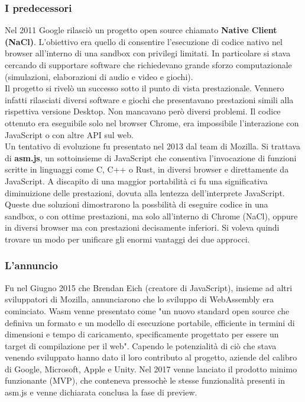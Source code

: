 \subsubsection{I predecessori}
Nel 2011 Google rilasciò un progetto open source chiamato \textbf{Native Client (NaCl)}.
L'obiettivo era quello di consentire l'esecuzione di codice nativo nel browser all'interno di una sandbox con privilegi limitati.
In particolare si stava cercando di supportare software che richiedevano grande sforzo computazionale (simulazioni, elaborazioni di audio e video e giochi).
\\Il progetto si rivelò un successo sotto il punto di vista prestazionale. Vennero infatti rilasciati diversi software e giochi che presentavano prestazioni simili alla rispettiva versione Desktop.
Non mancavano però diversi problemi. Il codice ottenuto era eseguibile solo nel browser Chrome, era impossibile l'interazione con JavaScript o con altre API sul web.
\\Un tentativo di evoluzione fu presentato nel 2013 dal team di Mozilla. Si trattava di \textbf{asm.js}, un sottoinsieme di JavaScript che consentiva l'invocazione di funzioni scritte in linguaggi come C, C++ o Rust, in diversi browser e direttamente da JavaScript.
A discapito di una maggior portabilità ci fu una significativa diminuizione delle prestazioni, dovuta alla lentezza dell'interprete JavaScript.
Queste due soluzioni dimostrarono la possbilità di eseguire codice in una sandbox, o con ottime prestazioni, ma solo all'interno di Chrome (NaCl), oppure in diversi browser ma con prestazioni decisamente inferiori.
Si voleva quindi trovare un modo per unificare gli enormi vantaggi dei due approcci.\cite*{wasmBook}
\subsubsection{L'annuncio}
Fu nel Giugno 2015 che Brendan Eich (creatore di JavaScript), insieme ad altri sviluppatori di Mozilla, annunciarono che lo sviluppo di WebAssembly era cominciato.\cite*{asmjsToWasm}
Wasm venne presentato come "un nuovo standard open source che definiva un formato e un modello di esecuzione portabile, efficiente in termini di dimensioni e tempo di caricamento, specificamente progettato per essere un target di compilazione per il web".
Capendo le potenzialità di ciò che stava venendo sviluppato hanno dato il loro contributo al progetto, aziende del calibro di Google, Microsoft, Apple e Unity.
Nel 2017 venne lanciato il prodotto minimo funzionante (MVP), che conteneva pressochè le stesse funzionalità presenti in asm.js e venne dichiarata conclusa la fase di preview.

